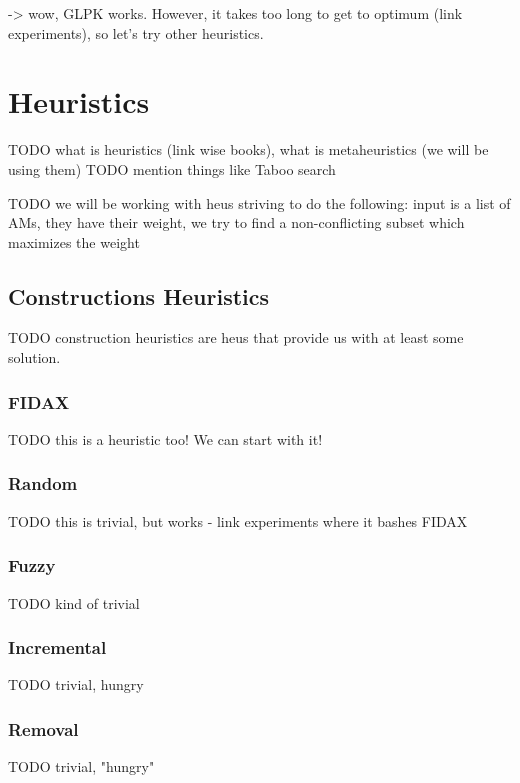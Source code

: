 \documentclass[a4paper,12pt,oneside]{report}
\begin{document}
 -> wow, GLPK works. However, it takes too long to get to optimum (link experiments), so let's try other heuristics.
 
\section{Heuristics}

TODO what is heuristics (link wise books), what is metaheuristics (we will be using them)
TODO mention things like Taboo search

TODO we will be working with heus striving to do the following: input is a list of AMs, they have their weight, we try to find a non-conflicting subset which maximizes the weight

\subsection{Constructions Heuristics}

TODO construction heuristics are heus that provide us with at least some solution.

\subsubsection{FIDAX}

TODO this is a heuristic too! We can start with it!

\subsubsection{Random}

TODO this is trivial, but works - link experiments where it bashes FIDAX

\subsubsection{Fuzzy}

TODO kind of trivial

\subsubsection{Incremental}

TODO trivial, hungry

\subsubsection{Removal}

TODO trivial, "hungry"
\end{document}
